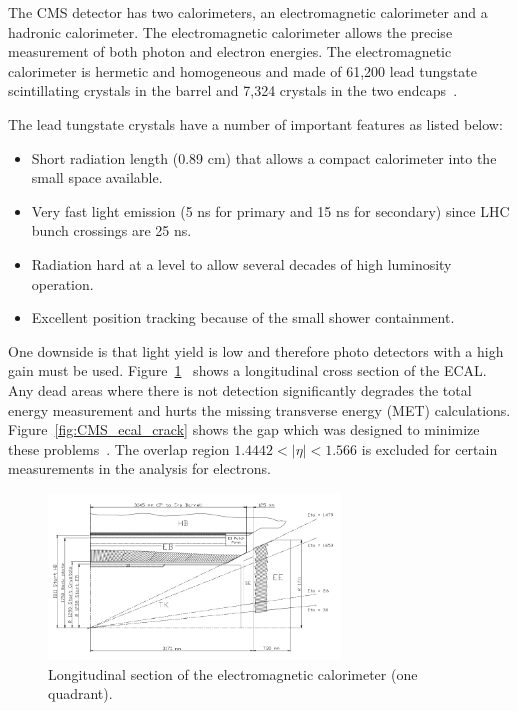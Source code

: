 The CMS detector has two calorimeters, an electromagnetic calorimeter and a hadronic calorimeter. The electromagnetic calorimeter allows the precise measurement of both photon and electron energies.  The electromagnetic calorimeter is hermetic and homogeneous and made of 61,200 lead tungstate scintillating crystals in the barrel and 7,324 crystals in the two endcaps~\cite{ECAL_report}.

The lead tungstate crystals have a number of important features as listed below:
\begin{itemize}
  \item
    Short radiation length (0.89 cm) that allows a compact calorimeter into the small space available.
  \item
    Very fast light emission (5 ns for primary and 15 ns for secondary) since LHC bunch crossings are 25 ns.
    \item
      Radiation hard at a level to allow several decades of high luminosity operation.
    \item
      Excellent position tracking because of the small shower containment. 
\end{itemize}

One downside is that light yield is low and therefore photo detectors with a high gain must be used.  Figure~\ref{fig:CMS_ecal_quadrant}~\cite{ECAL_report} shows a longitudinal cross section of the ECAL. Any dead areas where there is not detection significantly degrades the total energy measurement and hurts the missing transverse energy (MET) calculations. Figure~\ref{fig:CMS_ecal_crack} shows the gap which was designed to minimize these problems~\cite{ECAL_report}. The overlap region $1.4442 < |\eta| < 1.566$ is excluded for certain measurements in the analysis for electrons.

\begin{figure}[htb]
\centering
\includegraphics[width=0.69\textwidth]{Experiment/ECAL_quadrant.pdf}
\caption{Longitudinal section of the electromagnetic calorimeter (one quadrant).~\cite{ECAL_report}}
\label{fig:CMS_ecal_quadrant}
\end{figure}

